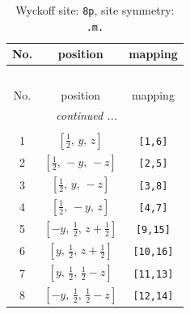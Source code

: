 \documentclass[fleqn,8pt]{jsarticle}
\begin{document}
\begin{longtable}{ccc}
\caption{Wyckoff site: {\tt 8p}, site symmetry: {\tt .m.}}
 \\
 \hline \hline
No. & position & mapping \\ \hline \endfirsthead

\multicolumn{2}{l}{\tablename\ \thetable{}} \\
 \hline \hline
No. & position & mapping \\ \hline \endhead

 \hline \hline
\multicolumn{2}{r}{\footnotesize\it continued ...} \\ \endfoot

 \hline \hline
\multicolumn{2}{r}{} \\ \endlastfoot

1 & $\left[ \frac{1}{2},\, y,\, z \right]$ & {\tt [1,6]} \\ \hline
2 & $\left[ \frac{1}{2},\, - y,\, - z \right]$ & {\tt [2,5]} \\ \hline
3 & $\left[ \frac{1}{2},\, y,\, - z \right]$ & {\tt [3,8]} \\ \hline
4 & $\left[ \frac{1}{2},\, - y,\, z \right]$ & {\tt [4,7]} \\ \hline
5 & $\left[ - y,\, \frac{1}{2},\, z + \frac{1}{2} \right]$ & {\tt [9,15]} \\ \hline
6 & $\left[ y,\, \frac{1}{2},\, z + \frac{1}{2} \right]$ & {\tt [10,16]} \\ \hline
7 & $\left[ y,\, \frac{1}{2},\, \frac{1}{2} - z \right]$ & {\tt [11,13]} \\ \hline
8 & $\left[ - y,\, \frac{1}{2},\, \frac{1}{2} - z \right]$ & {\tt [12,14]} \\
\end{longtable}
\renewcommand{\arraystretch}{1.2}
\end{document}
